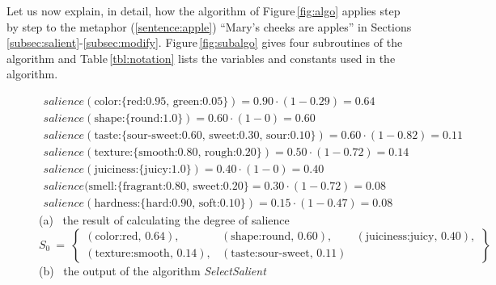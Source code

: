 Let us now explain, in detail, how the algorithm of Figure\,\ref{fig:algo} applies
step by step to the metaphor (\ref{sentence:apple})
``Mary's cheeks are apples'' in Sections\,\ref{subsec:salient}-\ref{subsec:modify}.
Figure\,\ref{fig:subalgo} gives four subroutines of the algorithm 
and Table\,\ref{tbl:notation} lists the variables and constants used in the algorithm.

\begin{figure}[t]
  \vspace*{-1mm}\small
  \begin{center}
    $\begin{array}{l}
      salience(\mbox{color:\{red:0.95, green:0.05\}}) = 0.90 \cdot (1-0.29) = 0.64 \\
      salience(\mbox{shape:\{round:1.0\}}) = 0.60 \cdot (1-0) = 0.60 \\
      salience(\mbox{taste:\{sour-sweet:0.60, sweet:0.30, sour:0.10\}}) = 
      0.60 \cdot  (1-0.82) = 0.11 \\
      salience(\mbox{texture:\{smooth:0.80, rough:0.20\}}) = 0.50 \cdot (1-0.72) = 0.14 \\
      salience(\mbox{juiciness:\{juicy:1.0\}}) = 0.40 \cdot (1-0) = 0.40 \\
      salience(\mbox{smell:\{fragrant:0.80, sweet:0.20\}} = 0.30 \cdot (1-0.72) = 0.08 \\
      salience(\mbox{hardness:\{hard:0.90, soft:0.10\}}) = 0.15 \cdot (1-0.47) = 0.08 
    \end{array}$\\[.5\baselineskip]
    (a)~ the result of calculating the degree of salience \\[\baselineskip]
    $S_0 ~=~ \left\{
    \begin{array}{lll}
      (\mbox{color:red},\,0.64), & 
      (\mbox{shape:round},\,0.60), & 
      (\mbox{juiciness:juicy},\,0.40), \\
      (\mbox{texture:smooth},\,0.14), &
      (\mbox{taste:sour-sweet},\,0.11) &
    \end{array}
    \right \}$\\[.5\baselineskip]
    (b)~ the output of the algorithm {\it SelectSalient} \\[\baselineskip]
\end{center}
\end{figure}

